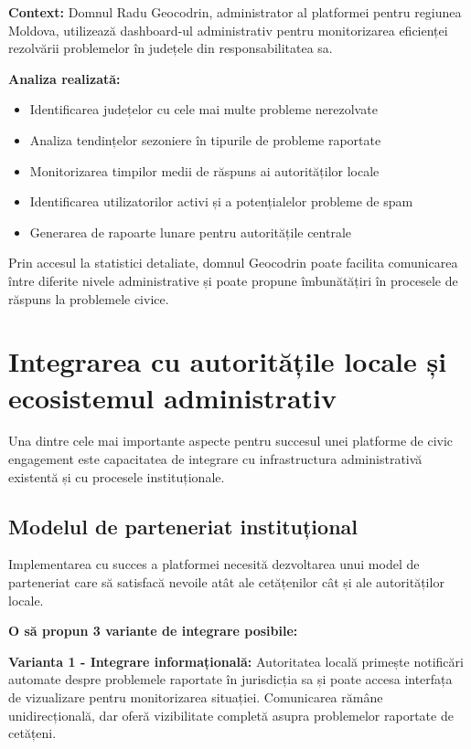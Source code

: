 \documentclass[12pt,a4paper]{report}
\begin{document}
\textbf{Context:} Domnul Radu Geocodrin, administrator al platformei pentru regiunea Moldova, utilizează dashboard-ul administrativ pentru monitorizarea eficienței rezolvării problemelor în județele din responsabilitatea sa.

\textbf{Analiza realizată:}
\begin{itemize}
\item Identificarea județelor cu cele mai multe probleme nerezolvate
\item Analiza tendințelor sezoniere în tipurile de probleme raportate
\item Monitorizarea timpilor medii de răspuns ai autorităților locale
\item Identificarea utilizatorilor activi și a potențialelor probleme de spam
\item Generarea de rapoarte lunare pentru autoritățile centrale
\end{itemize}

Prin accesul la statistici detaliate, domnul  Geocodrin poate facilita comunicarea între diferite nivele administrative și poate propune îmbunătățiri în procesele de răspuns la problemele civice.

\section{Integrarea cu autoritățile locale și ecosistemul administrativ}

Una dintre cele mai importante aspecte pentru succesul unei platforme de civic engagement este capacitatea de integrare cu infrastructura administrativă existentă și cu procesele instituționale.

\subsection{Modelul de parteneriat instituțional}

Implementarea cu succes a platformei necesită dezvoltarea unui model de parteneriat care să satisfacă nevoile atât ale cetățenilor cât și ale autorităților locale.

\textbf{O să propun 3 variante de integrare posibile:}

\textbf{Varianta 1 - Integrare informațională:} Autoritatea locală primește notificări automate despre problemele raportate în jurisdicția sa și poate accesa interfața de vizualizare pentru monitorizarea situației. Comunicarea rămâne unidirecțională, dar oferă vizibilitate completă asupra problemelor raportate de cetățeni.
\end{document}
